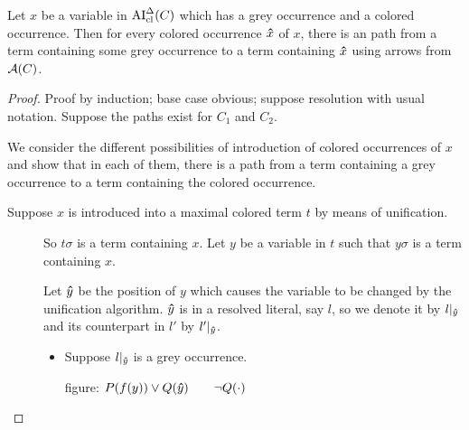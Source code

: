\documentclass[,%
	paper=a4,%
	DIV11, %
	twoside=false,%
	liststotoc,
	bibtotoc,
	draft=false,%
	numbers=noendperiod
]{scrartcl}
\begin{document}
{\tiny

	\begin{clemma}
		Let $x$ be a variable in $\operatorname{AI}_\mathrm{cl}^\Delta(C)$ which has a grey occurrence and a colored occurrence.
		Then for every colored occurrence $\bm\hat x$ of $x$, there is an path from a term containing some grey occurrence to a term containing $\bm\hat x$ using arrows from $\operatorname{\mathcal{A}}(C)$.
	\end{clemma}
	\begin{proof}
		\newcommand{\one}{\circled{1}}
		\newcommand{\two}{\circled{2}}
		Proof by induction; base case obvious; suppose resolution with usual notation.
		Suppose the paths exist for $C_1$ and $C_2$.

		We consider the different possibilities of introduction of colored occurrences of $x$ and show that in each of them, there is a path from a term containing a grey occurrence to a term containing the colored occurrence.

		\begin{description}
			\item[Suppose $x$ is introduced into a maximal colored term $t$ by means of unification.]
				So $t\sigma$ is a term containing $x$.
				Let $y$ be a variable in $t$ such that $y\sigma$ is a term containing $x$.

				Let $\bm\hat y$ be the position of $y$ which causes the variable to be changed by the unification algorithm.
				$\bm\hat y$ is in a resolved literal, say $l$, so we denote it by $l|_{\bm\hat y}$ and its counterpart in $l'$ by $l'|_{\bm\hat y}$. 

				\begin{itemize}
					\item Suppose $l|_{\bm\hat y}$ is a grey occurrence.

						figure: $P(f(y)) \lor Q(\bm\hat y)\quad\quad\lnot Q(\cdot)$


\end{itemize}
\end{description}
\end{proof}}
\end{document}
